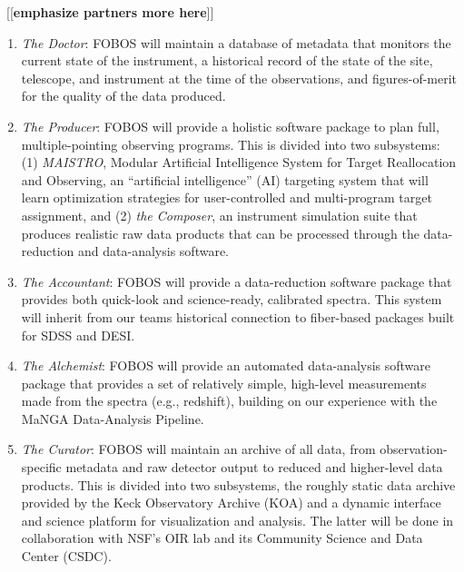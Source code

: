 \documentclass[oneside,11pt]{amsart}
\newcommand{\comment}[2][todo]{{\color{#1}[[{\bf #2}]]}}
\begin{document}
~\comment{emphasize partners more here}

\begin{enumerate}
%
\item {\it The Doctor}: FOBOS will maintain a database of metadata
that monitors the current state of the instrument, a historical
record of the state of the site, telescope, and instrument at the
time of the observations, and figures-of-merit for the quality of the
data produced.
%
\item {\it The Producer}: FOBOS will provide a holistic software
package to plan full, multiple-pointing observing programs. This is
divided into two subsystems: (1) {\it MAISTRO}, Modular Artificial
Intelligence System for Target Reallocation and Observing, an
``artificial intelligence'' (AI) targeting system that will learn
optimization strategies for user-controlled and multi-program target
assignment, and (2) {\it the Composer}, an instrument simulation
suite that produces realistic raw data products that can be processed
through the data-reduction and data-analysis software.
%
\item {\it The Accountant}: FOBOS will provide a data-reduction
software package that provides both quick-look and science-ready,
calibrated spectra. This system will inherit from our teams
historical connection to fiber-based packages built for SDSS and
DESI.
%
\item {\it The Alchemist}: FOBOS will provide an automated
data-analysis software package that provides a set of relatively
simple, high-level measurements made from the spectra (e.g.,
redshift), building on our experience with the MaNGA Data-Analysis
Pipeline.
%
\item {\it The Curator}: FOBOS will maintain an archive of all data,
from observation-specific metadata and raw detector output to reduced
and higher-level data products. This is divided into two subsystems,
the roughly static data archive provided by the Keck Observatory
Archive (KOA) and a dynamic interface and science platform for
visualization and analysis. The latter will be done in collaboration
with NSF's OIR lab and its Community Science and Data Center (CSDC).
%
\end{enumerate}


\end{document}
